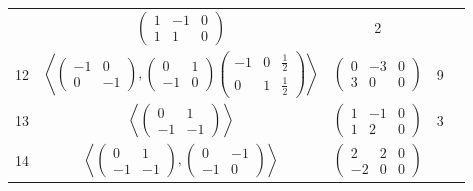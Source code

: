 \documentclass[a4paper,12pt]{amsart}
\begin{document}
\begin{table}[h]
\begin{tabular}{|c|c|c|c|c|}
		  & $\left(\begin{array}{cc|c}
		  	1 & -1  & 0\\ 
		  	1 & 1  & 0
		\end{array}\right)$ 
		  & 2 &\\
		  
		  
		  12 & $\left\langle 
		  \begin{pmatrix}
		  	-1 & 0  \\ 
		  	0 & -1  
		  \end{pmatrix}, 
		  \begin{pmatrix}
		  	0 & 1  \\ 
		  	-1 & 0  
		  \end{pmatrix}
		  \left(\begin{array}{cc|c}
		  	-1 & 0 &  \frac{1}{2} \\ 
		  	0 & 1  & \frac{1}{2}
		\end{array}\right)
		  \right\rangle$
		  
		  & $\left(\begin{array}{cc|c}  
		  	0 & -3  & 0\\ 
		  	3 & 0  & 0
		  	\end{array}\right)$ 
		  & 9 &\\
		  
		   13 & $\left\langle 
		  \begin{pmatrix}
		  	0 & 1 \\ 
		  	-1 & -1 
		  \end{pmatrix} 			
		  \right\rangle$
		  
		  & $\left(\begin{array}{cc|c}  
		  	1 & -1  & 0\\ 
		  	1 & 2   & 0
		\end{array}\right)$  
		  
		  & 3 &\\
		  
		  
		   14 & $\left\langle 
		  \begin{pmatrix}
		  	0 & 1 \\ 
		  	-1 & -1 
		  \end{pmatrix}, 			
		  \begin{pmatrix}
		  	0 & -1 \\ 
		  	-1 & 0
		  \end{pmatrix}
		  \right\rangle$
		  
		  & $\left(\begin{array}{cc|c}  
		  	2 & 2  & 0\\ 
		  	-2 & 0   & 0
		  \end{array}\right)$  
		  

\end{tabular}
\end{table}
\end{document}
